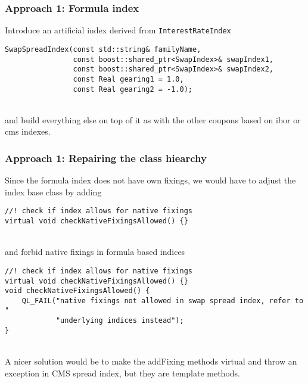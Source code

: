 \documentclass{beamer}
\begin{document}
\begin{frame}[fragile]
\frametitle{Approach 1: Formula index}
Introduce an artificial index derived from \verb+InterestRateIndex+
\vspace{2mm}
\begin{verbatim}
SwapSpreadIndex(const std::string& familyName,
                const boost::shared_ptr<SwapIndex>& swapIndex1,
                const boost::shared_ptr<SwapIndex>& swapIndex2,
                const Real gearing1 = 1.0,
                const Real gearing2 = -1.0);
\end{verbatim}
\\
\vspace{2mm}
and build everything else on top of it as with the other coupons based
on ibor or cms indexes.
\end{frame}

\begin{frame}[fragile]
\frametitle{Approach 1: Repairing the class hiearchy}
Since the formula index does not have own fixings, we would have to
adjust the index base class by adding
\vspace{2mm}
\begin{verbatim}
//! check if index allows for native fixings
virtual void checkNativeFixingsAllowed() {}
\end{verbatim}
\\
\vspace{2mm}
and forbid native fixings in formula based indices
\vspace{2mm}
\begin{verbatim}
//! check if index allows for native fixings
virtual void checkNativeFixingsAllowed() {}
void checkNativeFixingsAllowed() {
    QL_FAIL("native fixings not allowed in swap spread index, refer to "
            "underlying indices instead");
}
\end{verbatim}
\\
\vspace{2mm}
A nicer solution would be to make the addFixing methods virtual and throw
an exception in CMS spread index, but they are template methods.
\end{frame}
\end{document}

